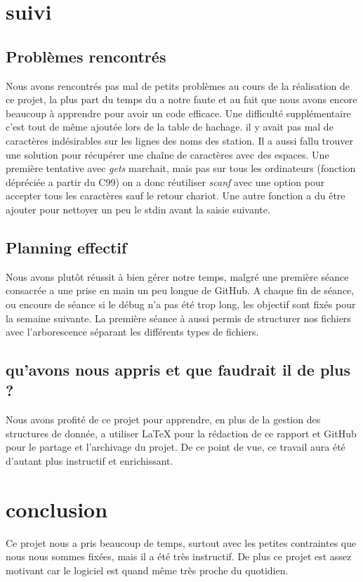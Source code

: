 \documentclass[12pt]{report}
\begin{document}
\chapter{suivi}
\section{Problèmes rencontrés}

Nous avons rencontrés pas mal de petits problèmes au cours de la réalisation de ce projet, la plus part du temps du a notre faute et au fait que nous avons encore beaucoup à apprendre pour avoir un code efficace. Une difficulté supplémentaire c'est tout de même ajoutée lors de la table de hachage. il y avait pas mal de caractères indésirables sur les lignes des noms des station. Il a aussi fallu trouver une solution pour récupérer une chaîne de caractères avec des espaces. Une première tentative avec \emph{gets} marchait, mais pas sur tous les ordinateurs (fonction dépréciée a partir du C99) on a donc réutiliser \emph{scanf} avec une option pour accepter tous les caractères sauf le retour chariot. Une autre fonction a du être ajouter pour nettoyer un peu le stdin avant la saisie suivante.

\section{Planning effectif}

Nous avons plutôt réussit à bien gérer notre temps, malgré une première séance consacrée a une prise en main un peu longue de GitHub. A chaque fin de séance, ou encours de séance si le débug n'a pas été trop long, les objectif sont fixés pour la semaine suivante. \newline La première séance à aussi permis de structurer nos fichiers avec l'arborescence séparant les différents types de fichiers.

\section{qu'avons nous appris et que faudrait il de plus ?}
Nous avons profité de ce projet pour apprendre, en plus de la gestion des structures de donnée, a utiliser LaTeX pour la rédaction de ce rapport et GitHub pour le partage et l'archivage du projet. De ce point de vue, ce travail aura été d'autant plus instructif et enrichissant.


\chapter{conclusion}

Ce projet nous a pris beaucoup de temps, surtout avec les petites contraintes que nous nous sommes fixées, mais il a été très instructif. De plus ce projet est assez motivant car le logiciel est quand même très proche du quotidien. 
\end{document}
